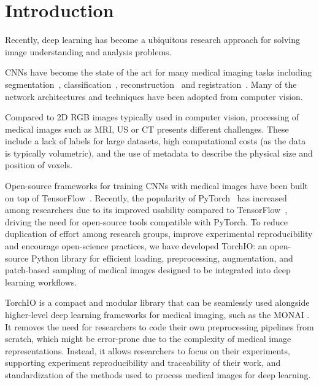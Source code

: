 \section{Introduction}

Recently, deep learning has become a ubiquitous research approach for solving image understanding and analysis problems.

\Acp{CNN} have become the state of the art for many medical imaging tasks including segmentation~\cite{cicek_3d_2016}, classification~\cite{lu_multimodal_2018}, reconstruction~\cite{chen_variable-density_2018} and registration~\cite{shan_unsupervised_2018}.
Many of the network architectures and techniques have been adopted from computer vision.

Compared to 2D \ac{RGB} images typically used in computer vision, processing of medical images such as \ac{MRI}, \ac{US} or \ac{CT} presents different challenges.
These include a lack of labels for large datasets, high computational costs (as the data is typically volumetric), and the use of metadata to describe the physical size and position of voxels.

Open-source frameworks for training \acp{CNN} with medical images have been built on top of TensorFlow~\cite{abadi_tensorflow_2016,pawlowski_dltk_2017,gibson_niftynet_2018}.
Recently, the popularity of PyTorch~\cite{paszke_pytorch_2019} has increased among researchers due to its improved usability compared to TensorFlow~\cite{he_state_2019}, driving the need for open-source tools compatible with PyTorch.
To reduce duplication of effort among research groups, improve experimental reproducibility and encourage open-science practices, we have developed TorchIO: an open-source Python library for efficient loading, preprocessing, augmentation, and patch-based sampling of medical images designed to be integrated into deep learning workflows.

TorchIO is a compact and modular library that can be seamlessly used alongside higher-level deep learning frameworks for medical imaging, such as the \ac{MONAI}%
.
It removes the need for researchers to code their own preprocessing pipelines from scratch, which might be error-prone due to the complexity of medical image representations.
Instead, it allows researchers to focus on their experiments, supporting experiment reproducibility and traceability of their work, and standardization of the methods used to process medical images for deep learning.
